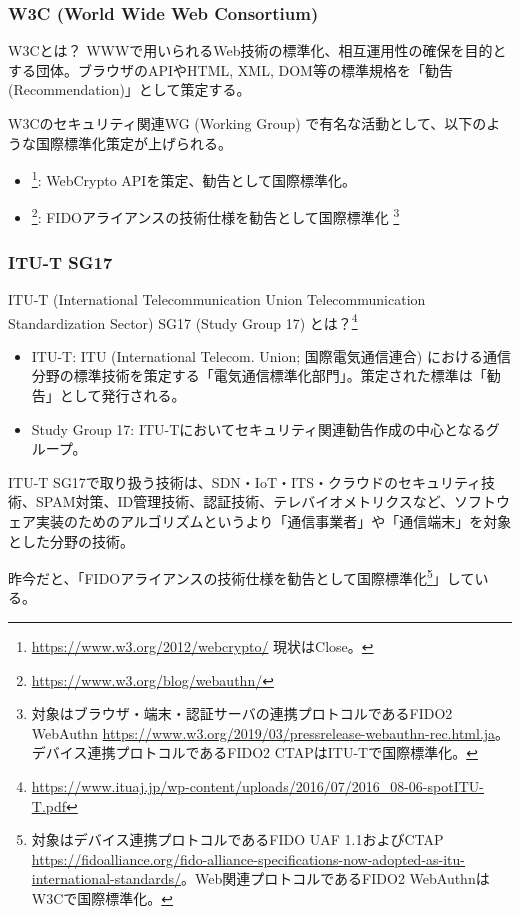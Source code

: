 \documentclass[12pt,dvipdfmx]{beamer}
\begin{document}
\begin{frame}
\frametitle{W3C (World Wide Web Consortium)}
\begin{block}{W3Cとは？}
WWWで用いられるWeb技術の標準化、相互運用性の確保を目的とする団体。ブラウザのAPIやHTML, XML, DOM等の標準規格を「勧告 (Recommendation)」として策定する。
\end{block}

\end{frame}

\begin{frame}
W3Cのセキュリティ関連WG (Working Group) で有名な活動として、以下のような国際標準化策定が上げられる。
\begin{itemize}
 \item {}\footnote[frame]{\scriptsize \url{https://www.w3.org/2012/webcrypto/} 現状はClose。}: WebCrypto APIを策定、勧告として国際標準化。
 \item {}\footnote[frame]{\scriptsize \url{https://www.w3.org/blog/webauthn/}}: FIDOアライアンスの技術仕様を勧告として国際標準化 \footnote[frame]{\scriptsize 対象はブラウザ・端末・認証サーバの連携プロトコルであるFIDO2 WebAuthn \url{https://www.w3.org/2019/03/pressrelease-webauthn-rec.html.ja}。デバイス連携プロトコルであるFIDO2 CTAPはITU-Tで国際標準化。}
\end{itemize} 
\end{frame}

\begin{frame}
\frametitle{ITU-T SG17}
\begin{block}{\footnotesize ITU-T (International Telecommunication Union Telecommunication Standardization Sector) SG17 (Study Group 17) とは？\footnote[frame]{\scriptsize \url{https://www.ituaj.jp/wp-content/uploads/2016/07/2016_08-06-spotITU-T.pdf}}}
\begin{itemize}
 \item ITU-T: ITU (International Telecom. Union; 国際電気通信連合) における通信分野の標準技術を策定する「電気通信標準化部門」。策定された標準は「勧告」として発行される。
 \item Study Group 17: ITU-Tにおいてセキュリティ関連勧告作成の中心となるグループ。
\end{itemize}
\end{block}

\end{frame}

\begin{frame}
ITU-T SG17で取り扱う技術は、SDN・IoT・ITS・クラウドのセキュリティ技術、SPAM対策、ID管理技術、認証技術、テレバイオメトリクスなど、ソフトウェア実装のためのアルゴリズムというより\alert{「通信事業者」や「通信端末」を対象とした分野の技術}。

\vspace{1ex}

昨今だと、「FIDOアライアンスの技術仕様を勧告として国際標準化\footnote[frame]{\scriptsize 対象はデバイス連携プロトコルであるFIDO UAF 1.1およびCTAP \url{https://fidoalliance.org/fido-alliance-specifications-now-adopted-as-itu-international-standards/}。Web関連プロトコルであるFIDO2 WebAuthnはW3Cで国際標準化。}」している。

\end{frame}
\end{document}
